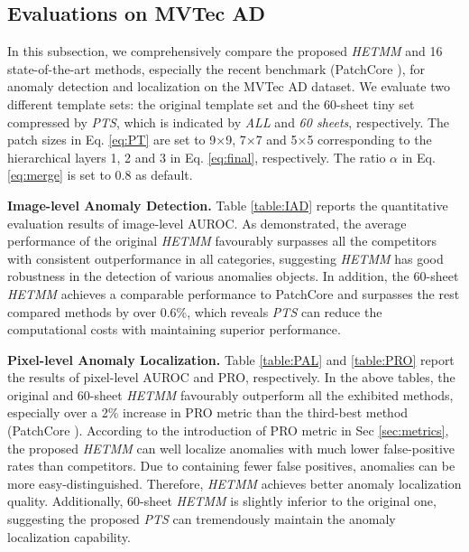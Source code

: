 \documentclass[default,iicol]{sn-jnl}\usepackage[algo2e,ruled,linesnumbered]{algorithm2e}
\theoremstyle{thmstyleone}\newtheorem{theorem}{Theorem}\newtheorem{proposition}[theorem]{Proposition}
\theoremstyle{thmstyletwo}\newtheorem{example}{Example}\newtheorem{remark}{Remark}
\theoremstyle{thmstylethree}\newtheorem{definition}{Definition}
\begin{document}
\subsection{Evaluations on MVTec AD} \label{EXP:MVTec}
In this subsection, we comprehensively compare the proposed \textit{HETMM} and 16 state-of-the-art methods, especially the recent benchmark (PatchCore \cite{patchcore}), for anomaly detection and localization on the MVTec AD dataset.
We evaluate two different template sets: the original template set and the 60-sheet tiny set compressed by \textit{PTS}, which is indicated by \textit{ALL} and \textit{60 sheets}, respectively.
The patch sizes in Eq. \ref{eq:PT} are set to 9$\times$9, 7$\times$7 and 5$\times$5 corresponding to the hierarchical layers 1, 2 and 3 in Eq. \ref{eq:final}, respectively.
The ratio $\alpha$ in Eq. \ref{eq:merge} is set to $0.8$ as default.

\noindent\textbf{Image-level Anomaly Detection. }
Table \ref{table:IAD} reports the quantitative evaluation results of image-level AUROC.
As demonstrated, the average performance of the original \textit{HETMM} favourably surpasses all the competitors with consistent outperformance in all categories, suggesting \textit{HETMM} has good robustness in the detection of various anomalies objects.
In addition, the 60-sheet \textit{HETMM} achieves a comparable performance to PatchCore \cite{patchcore} and surpasses the rest compared methods by over 0.6\%, which reveals \textit{PTS} can reduce the computational costs with maintaining superior performance.

\noindent\textbf{Pixel-level Anomaly Localization. }
Table \ref{table:PAL} and \ref{table:PRO} report the results of pixel-level AUROC and PRO, respectively.
In the above tables, the original and 60-sheet \textit{HETMM} favourably outperform all the exhibited methods, especially over a 2\% increase in PRO metric than the third-best method (PatchCore \cite{patchcore}).
According to the introduction of PRO metric in Sec \ref{sec:metrics}, the proposed \textit{HETMM} can well localize anomalies with much lower false-positive rates than competitors.
Due to containing fewer false positives, anomalies can be more easy-distinguished. 
Therefore, \textit{HETMM} achieves better anomaly localization quality.
Additionally, 60-sheet \textit{HETMM} is slightly inferior to the original one, suggesting the proposed \textit{PTS} can tremendously maintain the anomaly localization capability.
\end{document}
